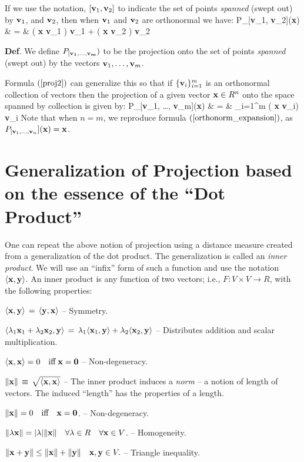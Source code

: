 \documentclass[12pt]{article}
\begin{document}
{If we use the notation, $[{\bf v}_1, {\bf v}_2]$ to indicate the set of 
points {\em spanned\/} (swept out) by ${\bf v}_1$, and ${\bf v}_2$,
then when ${\bf v}_1$ and ${\bf v}_2$ are orthonormal we have:
\be
  P_{[{\bf v}_1, {\bf v}_2]}({\bf x}) & = & ( {\bf x} {\boldsymbol \cdot} {\bf v}_1 ) {\bf v}_1 +  ( {\bf x} {\boldsymbol \cdot} {\bf v}_2 ) {\bf v}_2  \label{proj2}
\ee

{\bf Def}. We define $P_{[{\bf v_1, \ldots, {\bf v_m}}})$ to be the projection
onto the set of points {\em spanned\/} (swept out) by the vectors
${\bf v}_1, \ldots, {\bf v}_m$.

Formula $(\ref{proj2})$ can generalize this so that if 
$\{{\bf v}_i\}_{i=1}^m$ is an orthonormal collection of vectors then the 
projection of a given vector ${\bf x} \in R^n$ onto the 
space spanned by collection is given by:
\be
  P_{[{\bf v}_1, \ldots, {\bf v}_m]}({\bf x}) & = & \sum_{i=1}^m ( {\bf x} {\boldsymbol \cdot} {\bf v}_i) {\bf v}_i \label{projection}
\ee
Note that when $n = m$, we reproduce formula $(\ref{orthonorm_expansion})$, 
as $P_{[{\bf v}_1, \ldots, {\bf v}_n}]({\bf x}) = {\bf x}$.

\section{Generalization of Projection based on the essence of the ``Dot Product''}

One can repeat the above notion of projection using a distance measure created from a generalization of the dot product.
The generalization is called an {\em inner product}. We will use an ``infix'' form of such a function and use the notation
$\langle{\bf x}, {\bf y}\rangle$. An inner product is any function of two vectors; i.e., $F: V \times V \rightarrow R$,  with the following properties:
\bi
  \item{ $ \langle {\bf x}, {\bf y}\rangle \, = \, \langle{\bf y}, {\bf x}\rangle$ -- Symmetry.}
  \item{ $ \langle \lambda_1 {\bf x}_1 + \lambda_2 {\bf x}_2, {\bf y}\rangle \, = \, 
      \lambda_1 \langle{\bf x}_1, {\bf y}\rangle + \lambda_2 \langle{\bf x}_2, {\bf y}\rangle $ -- Distributes addition and scalar multiplication.}
  \item{ $ \langle {\bf x}, {\bf x}\rangle = 0 \quad \text{iff} \; {\bf x} = {\bf 0} $ -- Non-degeneracy.}
  \item{ $\|{\bf x}\| \, \equiv \, \sqrt{\langle{\bf x}, {\bf x}\rangle}$ -- 
      The inner product induces a {\em norm} -- a notion of length of vectors.}
\ei
    The induced ``length'' has the properties of a length.
\bi
  \item{$\|{\bf x}\| = 0 \quad \text{iff} \quad {\bf x} = {\bf 0}$. -- Non-degeneracy.}
  \item{$ \|\lambda {\bf x}\| = |\lambda| \|{\bf x}\|\quad \forall \lambda \in R \quad \forall {\bf x} \in V$. -- Homogeneity.}
  \item{$\|{\bf x} + {\bf y} \| \le \|{\bf x}\| + \|{\bf y}\| \quad {\bf x}, {\bf y} \in V.$ -- Triangle inequality.}
\ei

}
\end{document}
